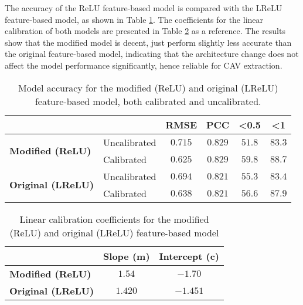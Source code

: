 The accuracy of the ReLU feature-based model is compared with the LReLU feature-based model, as shown in Table \ref{tab:model_accuracy_relu}. The coefficients for the linear calibration of both models are presented in Table \ref{tab:linear_regression_coefficients_relu} as a reference. The results show that the modified model is decent, just perform slightly less accurate than the original feature-based model, indicating that the architecture change does not affect the model performance significantly, hence reliable for CAV extraction.

\begin{table}[H]
    \centering
    \begin{tabular}{|l|l|c|c|c|c|}
        \hline
        \multicolumn{2}{|l|}{\textbf{}} & \textbf{RMSE} & \textbf{PCC} & \textbf{\textless 0.5} & \textbf{\textless 1}          \\ \hline
        \multirow{2}{*}{\textbf{Modified (ReLU)}}
                                        & Uncalibrated  & $0.715$      & $0.829$                & $51.8$               & $83.3$ \\ \cline{2-6}
                                        & Calibrated    & $0.625$      & $0.829$                & $59.8$               & $88.7$ \\ \hline
        \multirow{2}{*}{\textbf{Original (LReLU)}}
                                        & Uncalibrated  & $0.694$      & $0.821$                & $55.3$               & $83.4$ \\ \cline{2-6}
                                        & Calibrated    & $0.638$      & $0.821$                & $56.6$               & $87.9$ \\ \hline
    \end{tabular}
    \caption{Model accuracy for the modified (ReLU) and original (LReLU) feature-based model, both calibrated and uncalibrated.}
    \label{tab:model_accuracy_relu}
\end{table}


\begin{table}[H]
    \centering
    \begin{tabular}{|l|c|c|}
        \hline
        \textbf{}                 & \textbf{Slope (m)} & \textbf{Intercept (c)} \\ \hline
        \textbf{Modified (ReLU)}  & $1.54$             & $-1.70$                \\ \hline
        \textbf{Original (LReLU)} & $1.420$            & $-1.451$               \\ \hline
    \end{tabular}
    \caption{Linear calibration coefficients for the modified (ReLU) and original (LReLU) feature-based model}
    \label{tab:linear_regression_coefficients_relu}
\end{table}

